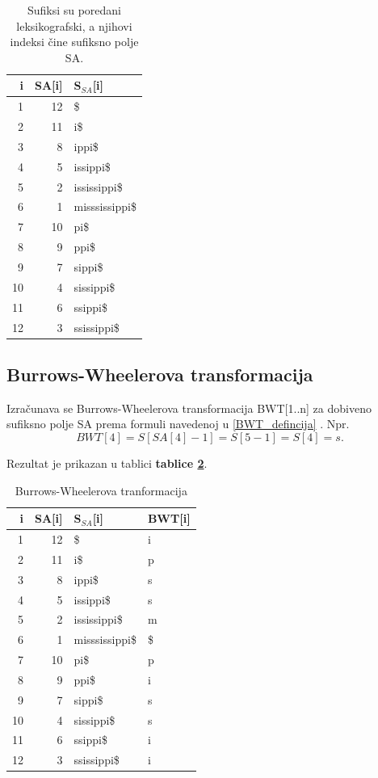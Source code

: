 \documentclass[a4paper,12pt]{article}
\begin{document}
\begin{enumerate}
	\begin{table}[h!]
		\caption{Sufiksi su poredani leksikografski, a njihovi indeksi čine sufiksno polje SA.}
		\label{tablePrimjer3}
		\begin{center}
			\begin{tabular}{rrl}
				\toprule
				i & SA[i] & S$_{SA}$[i] \\
				\midrule
				1 & 12 & \$ \\
				2 & 11 &  i\$ \\
				3 & 8 & ippi\$ \\
				4 & 5 & issippi\$ \\
				5 & 2 & ississippi\$ \\
				6 & 1 & misssissippi\$ \\
				7 & 10 & pi\$ \\
				8 & 9 & ppi\$ \\
				9 & 7 & sippi\$ \\
				10 & 4 & sissippi\$ \\
				11 & 6 & ssippi\$ \\
				12 & 3 & ssissippi\$ \\
				\bottomrule
			\end{tabular}
		\end{center}
	\end{table}
\end{enumerate}

\subsection{Burrows-Wheelerova transformacija}

Izračunava se Burrows-Wheelerova transformacija BWT[1..n] za dobiveno sufiksno polje SA prema formuli navedenoj u \ref{BWT_defincija} .  
Npr. $$BWT[4]=S[SA[4]-1]=S[5-1]=S[4]=s.$$

Rezultat je prikazan u tablici \textbf{tablice \ref{tableEx3}}. 

\begin{table}[h!]
	\caption{Burrows-Wheelerova tranformacija}
	\label{tableEx3}
	\begin{center}
		\begin{tabular}{rrll}
			\toprule
			i & SA[i] & S$_{SA}$[i] & BWT[i] \\
			\midrule
			1 & 12 & \$ & i \\
			2 & 11 &  i\$ & p \\
			3 & 8 & ippi\$ & s \\
			4 & 5 & issippi\$ & s \\
			5 & 2 & ississippi\$ & m \\
			6 & 1 & misssissippi\$ & \$ \\
			7 & 10 & pi\$ & p \\
			8 & 9 & ppi\$ & i \\
			9 & 7 & sippi\$ & s \\
			10 & 4 & sissippi\$ & s \\
			11 & 6 & ssippi\$ & i \\
			12 & 3 & ssissippi\$ & i \\
			\bottomrule
		\end{tabular}
	\end{center}
\end{table}
\end{document}
